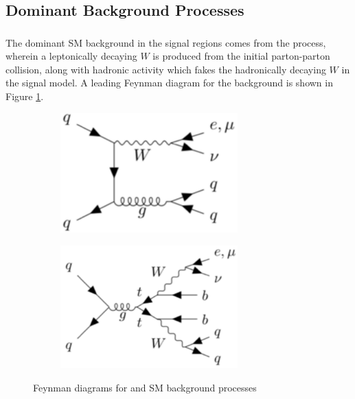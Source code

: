 \subsection{Dominant Background Processes}

\subsubsection{\wjets}
\label{sec:wjets_description}

The dominant SM background in the signal regions comes from the \wjets process, wherein a leptonically decaying \(W\) is produced from the initial parton-parton collision, along with hadronic activity which fakes the hadronically decaying \(W\) in the signal model. A leading Feynman diagram for the \wjets background is shown in Figure \ref{fig:Wjets_Feynman}.

\begin{figure}[h]
  \centering
     \begin{subfigure}{0.49\textwidth}
     \includegraphics[width = 0.75\textwidth]{Figures/4/Fey_Wjets.pdf}
    \caption{\wjets}
    \label{fig:Wjets_Feynman}
     \end{subfigure}
    \begin{subfigure}{0.49\textwidth}
     \includegraphics[width = 0.75\textwidth]{Figures/4/Fey_ttbar.pdf}
     \caption{\ttbar}
     \label{fig:ttbar_Feynman}
     \end{subfigure}
     \caption{Feynman diagrams for \wjets and \ttbar SM background processes}
     \label{fig:Feynman_bkgs}
  \end{figure}
  
